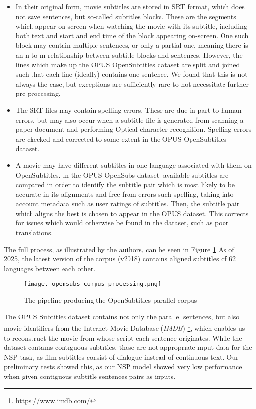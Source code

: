 \begin{itemize}
	\item
	      In their original form, movie subtitles are stored in SRT format, which does not save sentences, but so-called subtitles blocks.
	      These are the segments which appear on-screen when watching the movie with its subtitle, including both text and start and end time of the block appearing on-screen.
	      One such block may contain multiple sentences, or only a partial one, meaning there is an n-to-m-relationship between subtitle blocks and sentences.
	      However, the lines which make up the OPUS OpenSubtitles dataset are split and joined such that each line (ideally) contains one sentence.
	      We found that this is not always the case, but exceptions are sufficiently rare to not necessitate further pre-processing.
	\item The SRT files may contain spelling errors.
	      These are due in part to human errors, but may also occur when a subtitle file is generated from scanning a paper document and performing Optical character recognition.
	      Spelling errors are checked and corrected to some extent in the OPUS OpenSubtitles dataset.
	\item
	      A movie may have different subtitles in one language associated with them on OpenSubtitles.
	      In the OPUS OpenSubs dataset, available subtitles are compared in order to identify the subtitle pair which is most likely to be accurate in its alignments and free from errors such spelling, taking into account metadata such as user ratings of subtitles.
	      Then, the subtitle pair which aligns the best is chosen to appear in the OPUS dataset.
	      This corrects for issues which would otherwise be found in the dataset, such as poor translations.
\end{itemize}

The full process, as illustrated by the authors, can be seen in Figure \ref{fig:opensubtitles-pipeline}
As of 2025, the latest version of the corpus (v2018) contains aligned subtitles of 62 languages between each other.

\begin{figure}[H]
	\centering
	\texttt{[image: opensubs\_corpus\_processing.png]}
	\caption{The pipeline producing the OpenSubtitles parallel corpus}
	\label{fig:opensubtitles-pipeline}
\end{figure}

The OPUS Subtitles dataset contains not only the parallel sentences, but also movie identifiers from the Internet Movie Database (\textit{IMDB}) \footnote{\url{https://www.imdb.com/}}, which enables us to reconstruct the movie from whose script each sentence originates.
While the dataset contains contiguous subtitles, these are not appropriate input data for the NSP task, as film subtitles consist of dialogue instead of continuous text.
Our preliminary tests showed this, as our NSP model showed very low performance when given contiguous subtitle sentences pairs as inputs.

